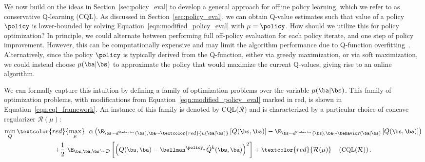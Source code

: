 We now build on the ideas in Section~\ref{sec:policy_eval}
to develop a general approach for offline policy learning, which we refer to as conservative Q-learning (CQL). 
As discussed in Section~\ref{sec:policy_eval}, we can obtain Q-value estimates such that value of a policy $\policy$
is lower-bounded by solving Equation~\ref{eqn:modified_policy_eval} with $\mu = \policy$. How should we utilize this for policy optimization? In principle, we could alternate between performing full off-policy evaluation for each policy iterate, and one step of policy improvement. However, this can be computationally expensive and may limit the algorithm performance due to Q-function overfitting~\citep{fu2019diagnosing}. Alternatively, since the policy $\policy$ is typically derived from the Q-function, either via greedy maximization, 
or via soft maximization, we could instead choose $\mu(\ba|\bs)$ to approximate the policy that would maximize the current Q-values, giving rise to an online algorithm.

We can formally capture this intuition by defining a family of optimization problems over the variable $\mu(\ba|\bs)$.
This family of optimization problems, with modifications from Equation~\ref{eqn:modified_policy_eval} marked in red, is shown in Equation~\ref{eqn:cql_framework}. An instance of this family is denoted by CQL($\mathcal{R}$) and is characterized by a particular choice of concave regularizer $\mathcal{R}(\mu)$:
\begin{multline}
    \label{eqn:cql_framework}
    \small{\min_{Q} \textcolor{red}{\max_{\mu}}~~ \alpha \left(\E_{\bs \sim d^\behavior(\bs), \ba \sim \textcolor{red}{\mu(\ba|\bs)}}\left[Q(\bs, \ba)\right] - \E_{\bs \sim d^\behavior(\bs), \ba \sim \behavior(\ba|\bs)}\left[Q(\bs, \ba)\right] \right)}\\
    \small{+ \frac{1}{2}~ \E_{\bs, \ba, \bs' \sim \mathcal{D}}\left[\left(Q(\bs, \ba) - \bellman^{\policy_k} \hat{Q}^{k} (\bs, \ba) \right)^2 \right] + \textcolor{red}{\mathcal{R}(\mu)} ~~~ \left(\text{CQL}(\mathcal{R})\right).}
\end{multline}

